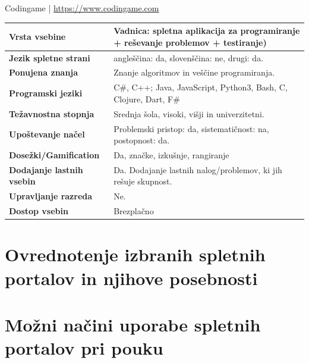 \begin{osebnabox}[label={osebna:codingame}]{Codingame |
    \url{https://www.codingame.com}}
    \begin{tabular}{
  p{} |
  p{}  }
  \textbf{Vrsta vsebine} & Vadnica: spletna aplikacija za
                           programiranje + reševanje problemov +
                           testiranje) \\
      \hline
  \textbf{Jezik spletne strani} & angleščina: da, slovenščina: ne,
                                  drugi: da. \\
      \hline
  \textbf{Ponujena znanja} & Znanje algoritmov in veščine programiranja. \\
      \hline
 \textbf{Programski jeziki} & C\#, C++; Java,   JavaScript, Python3,
                              Bash, C, Clojure, Dart, F\# \\  
      \hline
  \textbf{Težavnostna stopnja} & Srednja šola, visoki, višji in
                                 univerzitetni. \\ 
      \hline
   \textbf{Upoštevanje načel} & Problemski pristop: da,
                                sistematičnost: na, postopnost: da. \\
      \hline
  \textbf{Dosežki/Gamification} & Da, značke, izkušnje, rangiranje \\
      \hline
  \textbf{Dodajanje lastnih vsebin} & Da. Dodajanje lastnih
                                      nalog/problemov, ki jih rešuje
                                      skupnost. \\
      \hline
  \textbf{Upravljanje razreda} & Ne. \\ 
      \hline
  \textbf{Dostop vsebin} & Brezplačno   \\  

\end{tabular}
\end{osebnabox}

\section{Ovrednotenje izbranih spletnih portalov in njihove posebnosti}
\label{sec:pregled_spletnih_portalov}


\section{Možni načini uporabe spletnih portalov pri pouku}
\label{sec:načini_uporabe_sp}

